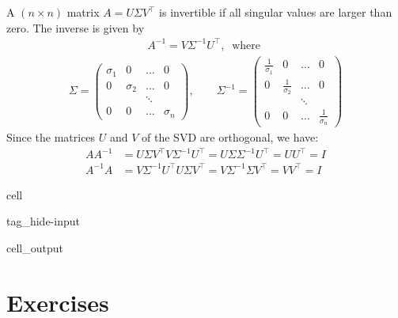 \documentclass[letterpaper,10pt,english]{jupyterBook}
\begin{document}
\sphinxAtStartPar
A \((n\times n)\) matrix \(A=U\Sigma V^\top\) is invertible if all singular values are larger than zero. The inverse is given by
\begin{equation*}
\begin{split}A^{-1} = V \Sigma^{-1} U^\top,\ \text{ where }\end{split}
\end{equation*}
\begin{align*}
    \Sigma=\begin{pmatrix}\sigma_1 & 0 & \ldots & 0 \\
    0 & \sigma_2 &\ldots & 0\\
      &     & \ddots &\\
    0 & 0   & \ldots & \sigma_n\end{pmatrix},\qquad 
    \Sigma^{-1}=
    \begin{pmatrix}\frac{1}{\sigma_1} & 0 & \ldots & 0 \\
    0 & \frac{1}{\sigma_2} &\ldots & 0\\
      &     & \ddots &\\
    0 & 0   & \ldots & \frac{1}{\sigma_n}\end{pmatrix}
\end{align*}
\sphinxAtStartPar
Since the matrices \(U\) and \(V\) of the SVD are orthogonal, we have:
\begin{align*}
AA^{-1} &= U\Sigma V^\top V\Sigma^{-1} U^\top = U\Sigma \Sigma^{-1} U^\top = UU^\top = I\\
A^{-1}A &= V \Sigma^{-1} U^\top U\Sigma V^\top = V \Sigma^{-1} \Sigma V^\top = V V^\top = I
\end{align*}
\begin{sphinxuseclass}{cell}
\begin{sphinxuseclass}{tag_hide-input}\begin{sphinxVerbatimOutput}

\begin{sphinxuseclass}{cell_output}
\noindent{}

\end{sphinxuseclass}\end{sphinxVerbatimOutput}

\end{sphinxuseclass}
\end{sphinxuseclass}
\sphinxstepscope


\section{Exercises}
\label{\detokenize{linalg_exercises:exercises}}\label{\detokenize{linalg_exercises::doc}}
\end{document}
